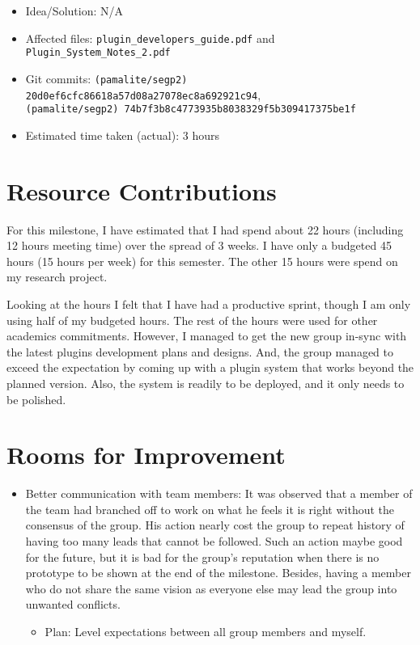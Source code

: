 \begin{itemize}
\begin{itemize}
	         \item Idea/Solution: N/A
	         \item Affected files: \texttt{plugin\_developers\_guide.pdf} and \texttt{Plugin\_System\_Notes\_2.pdf}
	         \item Git commits: \texttt{(pamalite/segp2) 20d0ef6cfc86618a57d08a27078ec8a692921c94}, \\\texttt{(pamalite/segp2) 74b7f3b8c4773935b8038329f5b309417375be1f}
	         \item Estimated time taken (actual): 3 hours
	     \end{itemize}
\end{itemize}

\section*{Resource Contributions}

For this milestone, I have estimated that I had spend about 22 hours (including 12 hours meeting time) over the spread of 3 weeks. I have only a budgeted 45 hours (15 hours per week) for this semester. The other 15 hours were spend on my research project. 

Looking at the hours I felt that I have had a productive sprint, though I am only using half of my budgeted hours. The rest of the hours were used for other academics commitments. However, I managed to get the new group in-sync with the latest plugins development plans and designs. And, the group managed to exceed the expectation by coming up with a plugin system that works beyond the planned version. Also, the system is readily to be deployed, and it only needs to be polished.  

\section*{Rooms for Improvement}

\begin{itemize}
   \item Better communication with team members: It was observed that a member of the team had branched off to work on what he feels it is right without the consensus of the group. His action nearly cost the group to repeat history of having too many leads that cannot be followed. Such an action maybe good for the future, but it is bad for the group's reputation when there is no prototype to be shown at the end of the milestone. Besides, having a member who do not share the same vision as everyone else may lead the group into unwanted conflicts. 
      \begin{itemize}
         \item Plan: Level expectations between all group members and myself.
      \end{itemize}
\end{itemize}
